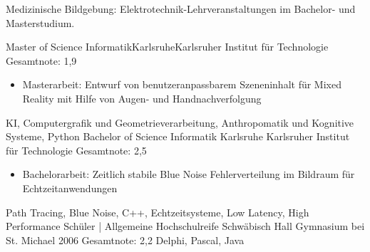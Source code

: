 {    
    \ifcvshowmedicalcoursework
    \noindent Medizinische Bildgebung: Elektrotechnik-Lehrveranstaltungen im Bachelor- und Masterstudium.\par
    \fi
    \begin{experiences}
    \education
    {
    }   {Master of Science Informatik}{Karlsruhe}{Karlsruher Institut für Technologie}
    {
    }
    {Gesamtnote: 1,9}
    {
        \ifcvshowthesislines
        \begin{itemize}
            \item Masterarbeit: Entwurf von benutzeranpassbarem Szeneninhalt für Mixed Reality mit Hilfe von Augen- und Handnachverfolgung
        \end{itemize}
        \fi
    }
    {KI, Computergrafik und Geometrieverarbeitung, Anthropomatik und Kognitive Systeme, Python}
    \emptySeparator
    {Bachelor of Science Informatik}
    {Karlsruhe}
    {Karlsruher Institut für Technologie}
    { 
    }
    {Gesamtnote: 2,5}
    {
    \ifcvshowthesislines
    \begin{itemize}
        \item Bachelorarbeit: Zeitlich stabile Blue Noise Fehlerverteilung im Bildraum für Echtzeitanwendungen
    \end{itemize}
    \fi
    }
    {Path Tracing, Blue Noise, C++, Echtzeitsysteme, Low Latency, High Performance}
    \ifcvshowschool
    \emptySeparator
    {Schüler | Allgemeine Hochschulreife}
    {Schwäbisch Hall}
    {Gymnasium bei St. Michael}
    {2006}
    {Gesamtnote: 2,2}
    {
    }
    {Delphi, Pascal, Java}
    \fi
    \end{experiences}
}
  


